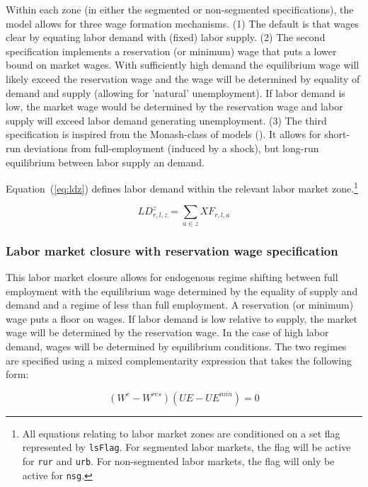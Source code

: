 \documentclass[11pt,letterpaper]{report}
\begin{document}
Within each zone (in either the segmented or non-segmented specifications),
the model allows for three wage formation mechanisms.
(1) The default is that wages clear by equating labor demand with
(fixed) labor supply. (2) The second specification implements a
reservation (or minimum) wage that puts a lower bound on market
wages. With sufficiently high demand the equilibrium wage will likely exceed the
reservation wage and the wage will be determined by equality of demand and
supply (allowing for 'natural' unemployment). If labor demand is low, the market
wage would be determined by the reservation wage and labor supply will exceed
labor demand generating unemployment. (3) The third specification
is inspired from the Monash-class of models (\cite{DixonRimmer2002}).
It allows for short-run deviations from full-employment (induced
by a shock), but long-run equilibrium between labor supply an demand.

Equation~(\ref{eq:ldz}) defines labor demand within the relevant labor market
zone.\footnote{All equations relating to labor market zones are conditioned on a
set flag represented by \texttt{lsFlag}. For segmented labor markets, the flag
will be active for \texttt{rur} and \texttt{urb}. For non-segmented labor
markets, the flag will only be active for \texttt{nsg}.}

\begin{equation}
\label{eq:ldz}
\mathit{LD}^z_{r,l,z} = \sum_{a \in z}{ \mathit{XF}_{r,l,a} }
\end{equation}

\subsubsection{Labor market closure with reservation wage specification}

This labor market closure allows for endogenous regime shifting between full
employment with the equilibrium wage determined by the equality of supply and
demand and a regime of less than full employment. A reservation (or minimum)
wage puts a floor on wages. If labor demand is low relative to supply, the
market wage will be determined by the reservation wage. In the case of high
labor demand, wages will be determined by equilibrium conditions. The two
regimes are specified using a mixed complementarity expression that takes the
following form:

\[
\left( W^e-\mathit{W}^{\mathit{res}}
\right)
\left(\mathit{UE} - \mathit{UE}^{\mathit{min}}
\right) = 0
\]
\end{document}
